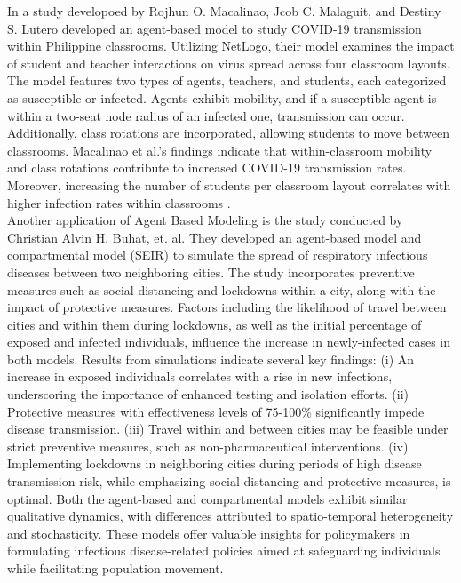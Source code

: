 In a study developoed by Rojhun O. Macalinao, Jcob C. Malaguit, and Destiny S. Lutero developed an agent-based model to study COVID-19 transmission within Philippine classrooms. Utilizing NetLogo, their model examines the impact of student and teacher interactions on virus spread across four classroom layouts. The model features two types of agents, teachers, and students, each categorized as susceptible or infected. Agents exhibit mobility, and if a susceptible agent is within a two-seat node radius of an infected one, transmission can occur. Additionally, class rotations are incorporated, allowing students to move between classrooms. Macalinao et al.'s findings indicate that within-classroom mobility and class rotations contribute to increased COVID-19 transmission rates. Moreover, increasing the number of students per classroom layout correlates with higher infection rates within classrooms \cite{abm_covid19}.
\\
Another application of Agent Based Modeling is the study conducted by Christian Alvin H. Buhat, et. al. They developed an agent-based model and compartmental model (SEIR) to simulate the spread of respiratory infectious diseases between two neighboring cities. The study incorporates preventive measures such as social distancing and lockdowns within a city, along with the impact of protective measures. Factors including the likelihood of travel between cities and within them during lockdowns, as well as the initial percentage of exposed and infected individuals, influence the increase in newly-infected cases in both models. Results from simulations indicate several key findings: (i) An increase in exposed individuals correlates with a rise in new infections, underscoring the importance of enhanced testing and isolation efforts. (ii) Protective measures with effectiveness levels of 75-100\% significantly impede disease transmission. (iii) Travel within and between cities may be feasible under strict preventive measures, such as non-pharmaceutical interventions. (iv) Implementing lockdowns in neighboring cities during periods of high disease transmission risk, while emphasizing social distancing and protective measures, is optimal. Both the agent-based and compartmental models exhibit similar qualitative dynamics, with differences attributed to spatio-temporal heterogeneity and stochasticity. These models offer valuable insights for policymakers in formulating infectious disease-related policies aimed at safeguarding individuals while facilitating population movement. \cite{unknown}
\\

